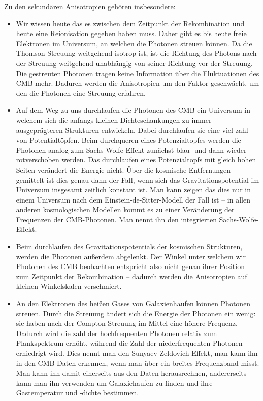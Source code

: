 \documentclass[10pt,a4paper]{article}
\begin{document}
Zu den sekundären Anisotropien gehören insbesondere:
\begin{itemize}
\item Wir wissen heute das es zwischen dem Zeitpunkt der Rekombination und heute eine Reionisation gegeben haben muss. Daher gibt es bis heute freie Elektronen im Universum, an welchen die Photonen streuen können. Da die Thomson-Streuung weitgehend isotrop ist, ist die Richtung des Photons nach der Streuung weitgehend unabhängig von seiner Richtung vor der Streuung. Die gestreuten Photonen tragen keine Information über die Fluktuationen des CMB mehr. Dadurch werden die Anisotropien um den Faktor geschwächt, um den die Photonen eine Streuung erfahren.
\item Auf dem Weg zu uns durchlaufen die Photonen des CMB ein Universum in welchem sich die anfangs kleinen Dichteschankungen zu immer ausgeprägteren Strukturen entwickeln. Dabei durchlaufen sie eine viel zahl von Potentialtöpfen. Beim durchqueren eines Potenzialtopfes werden die Photonen analog zum Sachs-Wolfe-Effekt zunächst blau- und dann wieder rotverschoben werden. Das durchlaufen eines Potenzialtopfs mit gleich hohen Seiten verändert die Energie nicht. Über die kosmische Entfernungen gemittelt ist dies genau dann der Fall, wenn sich das Gravitationspotential im Universum insgesamt zeitlich konstant ist. Man kann zeigen das dies nur in einem Universum nach dem Einstein-de-Sitter-Modell der Fall ist -- in allen anderen kosmologischen Modellen kommt es zu einer Veränderung der Frequenzen der CMB-Photonen. Man nennt ihn den integrierten Sachs-Wolfe-Effekt.\cite{Schneider}
\item Beim durchlaufen des Gravitationspotentials der kosmischen Strukturen, werden die Photonen außerdem abgelenkt. Der Winkel unter welchem wir Photonen des CMB beobachten entspricht also nicht genau ihrer Position zum Zeitpunkt der Rekombination -- dadurch werden die Anisotropien auf kleinen Winkelskalen verschmiert.\cite{Schneider}
\item An den Elektronen des heißen Gases von Galaxienhaufen können Photonen streuen. %
Durch die Streuung ändert sich die Energie der Photonen ein wenig: sie haben nach der Compton-Streuung im Mittel eine höhere Frequenz. Dadurch wird die zahl der hochfrequenten Photonen relativ zum Plankspektrum erhöht, während die Zahl der niederfrequenten Photonen erniedrigt wird. Dies nennt man den Sunyaev-Zeldovich-Effekt, man kann ihn in den CMB-Daten erkennen, wenn man über ein breites Frequenzband misst. Man kann ihn damit einerseits aus den Daten herausrechnen, andererseits kann man ihn verwenden um Galaxiehaufen zu finden und ihre Gastemperatur und -dichte bestimmen.\cite{Schneider}
\end{itemize}
\end{document}

